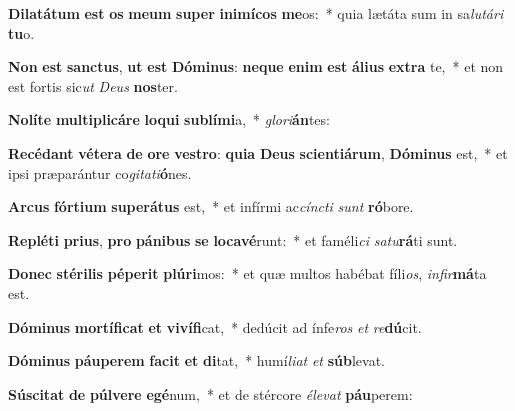 \item \textbf{Di}\textbf{la}\textbf{tá}\textbf{tum} \textbf{est} \textbf{os} \textbf{me}\textbf{um} \textbf{su}\textbf{per} \textbf{in}\textbf{i}\textbf{mí}\textbf{cos} \textbf{me}os:~* quia lætáta sum in sa\textit{lu}\textit{tá}\textit{ri} \textbf{tu}o.
\item \textbf{Non} \textbf{est} \textbf{sanc}\textbf{tus}, \textbf{ut} \textbf{est} \textbf{Dó}\textbf{mi}\textbf{nus}: \textbf{ne}\textbf{que} \textbf{e}\textbf{nim} \textbf{est} \textbf{á}\textbf{li}\textbf{us} \textbf{ex}\textbf{tra} te,~* et non est fortis sic\textit{ut} \textit{De}\textit{us} \textbf{nos}ter.
\item \textbf{No}\textbf{lí}\textbf{te} \textbf{mul}\textbf{ti}\textbf{pli}\textbf{cá}\textbf{re} \textbf{lo}\textbf{qui} \textbf{sub}\textbf{lí}\textbf{mi}a,~* \textit{glo}\textit{ri}\textbf{án}tes:
\item \textbf{Re}\textbf{cé}\textbf{dant} \textbf{vé}\textbf{te}\textbf{ra} \textbf{de} \textbf{o}\textbf{re} \textbf{ves}\textbf{tro}: \textbf{qui}\textbf{a} \textbf{De}\textbf{us} \textbf{sci}\textbf{en}\textbf{ti}\textbf{á}\textbf{rum}, \textbf{Dó}\textbf{mi}\textbf{nus} est,~* et ipsi præparántur co\textit{gi}\textit{ta}\textit{ti}\textbf{ó}nes.
\item \textbf{Ar}\textbf{cus} \textbf{fór}\textbf{ti}\textbf{um} \textbf{su}\textbf{pe}\textbf{rá}\textbf{tus} est,~* et infírmi ac\textit{cínc}\textit{ti} \textit{sunt} \textbf{ró}bore.
\item \textbf{Re}\textbf{plé}\textbf{ti} \textbf{pri}\textbf{us}, \textbf{pro} \textbf{pá}\textbf{ni}\textbf{bus} \textbf{se} \textbf{lo}\textbf{ca}\textbf{vé}runt:~* et faméli\textit{ci} \textit{sa}\textit{tu}\textbf{rá}ti sunt.
\item \textbf{Do}\textbf{nec} \textbf{sté}\textbf{ri}\textbf{lis} \textbf{pé}\textbf{pe}\textbf{rit} \textbf{plú}\textbf{ri}mos:~* et quæ multos habébat fíli\textit{os}, \textit{in}\textit{fir}\textbf{má}ta est.
\item \textbf{Dó}\textbf{mi}\textbf{nus} \textbf{mor}\textbf{tí}\textbf{fi}\textbf{cat} \textbf{et} \textbf{vi}\textbf{ví}\textbf{fi}cat,~* dedúcit ad ínfe\textit{ros} \textit{et} \textit{re}\textbf{dú}cit.
\item \textbf{Dó}\textbf{mi}\textbf{nus} \textbf{páu}\textbf{pe}\textbf{rem} \textbf{fa}\textbf{cit} \textbf{et} \textbf{di}tat,~* humí\textit{li}\textit{at} \textit{et} \textbf{súb}levat.
\item \textbf{Sú}\textbf{sci}\textbf{tat} \textbf{de} \textbf{púl}\textbf{ve}\textbf{re} \textbf{e}\textbf{gé}num,~* et de stércore \textit{é}\textit{le}\textit{vat} \textbf{páu}perem:
